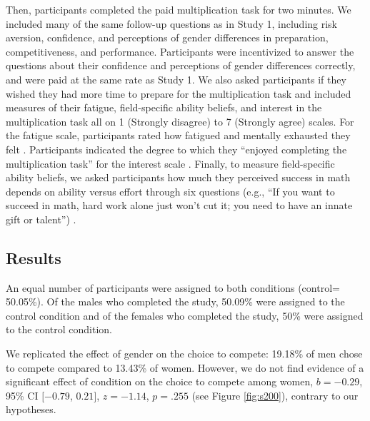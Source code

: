 \documentclass[a4paper, nobind]{templates/ociamthesis}
\begin{document}
Then, participants completed the paid multiplication task for two minutes. We included many of the same follow-up questions as in Study 1, including risk aversion, confidence, and perceptions of gender differences in preparation, competitiveness, and performance. Participants were incentivized to answer the questions about their confidence and perceptions of gender differences correctly, and were paid at the same rate as Study 1. We also asked participants if they wished they had more time to prepare for the multiplication task and included measures of their fatigue, field-specific ability beliefs, and interest in the multiplication task all on 1 (Strongly disagree) to 7 (Strongly agree) scales. For the fatigue scale, participants rated how fatigued and mentally exhausted they felt \autocite{Milyavskaya2018}. Participants indicated the degree to which they ``enjoyed completing the multiplication task'' for the interest scale \autocite{Milyavskaya2018}. Finally, to measure field-specific ability beliefs, we asked participants how much they perceived success in math depends on ability versus effort through six questions (e.g., ``If you want to succeed in math, hard work alone just won't cut it; you need to have an innate gift or talent'') \autocite{Meyer2015}.

\hypertarget{results-1}{%
\subsection{Results}\label{results-1}}

An equal number of participants were assigned to both conditions (control= 50.05\%). Of the males who completed the study, 50.09\% were assigned to the control condition and of the females who completed the study, 50\% were assigned to the control condition.

We replicated the effect of gender on the choice to compete: 19.18\% of men chose to compete compared to 13.43\% of women. However, we do not find evidence of a significant effect of condition on the choice to compete among women, \(b = -0.29\), 95\% CI \([-0.79\), \(0.21]\), \(z = -1.14\), \(p = .255\) (see Figure \ref{fig:s200}), contrary to our hypotheses.
\end{document}
